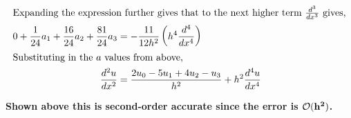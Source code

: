 \vspace{-0.3in}
\begin{align*}
    \shortintertext{Expanding the expression further gives that to the next higher term $\frac{d^3}{dx^3}$ gives,}
    0 + \frac{1}{24}a_1 + \frac{16}{24}a_2 + \frac{81}{24}a_3 & = -\frac{11}{12h^2}\left(h^4\frac{d^4}{dx^4}\right)\\
    \shortintertext{Substituting in the $a$ values from above,}
    \frac{d^2u}{dx^2} & = \frac{2u_0 - 5u_1 + 4u_2 - u_3}{h^2} + h^2\frac{d^4u}{dx^4}\\
\end{align*}

\vspace{-0.25in}

\begin{fminipage}{0.8\linewidth}
    \centering
    \textbf{Shown above this is second-order accurate since the error is $\bf \mathcal{O}(h^2)$.}
\end{fminipage}